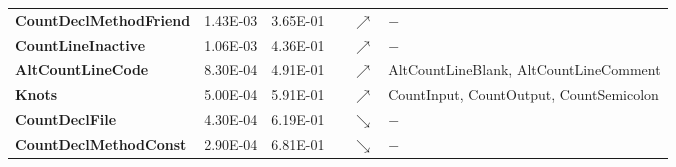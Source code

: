 \begin{sidewaystable}
\begin{tabularx}{\columnwidth}{>{\bfseries}lrrlcl}
CountDeclMethodFriend                      & 1.43E-03 & 3.65E-01 &     & $\nearrow$ &     $-$                                                                                                                                                                                                                                                                                                                                                             \\
CountLineInactive                          & 1.06E-03 & 4.36E-01 &     & $\nearrow$ &    $-$                                                                                                                                                                                                                                                                                                                                                              \\
AltCountLineCode                           & 8.30E-04 & 4.91E-01 &     & $\nearrow$ & AltCountLineBlank, AltCountLineComment                                                                                                                                                                                                                                                                                                                          \\
Knots                                      & 5.00E-04 & 5.91E-01 &     & $\nearrow$ & CountInput, CountOutput, CountSemicolon                                                                                                                                                                                                                                                                                                                         \\
CountDeclFile                              & 4.30E-04 & 6.19E-01 &     & $\searrow$ &    $-$                                                                                                                                                                                                                                                                                                                                                              \\
CountDeclMethodConst                       &2.90E-04 & 6.81E-01 &     & $\searrow$ &    $-$                                                                                                                                                                                                                                                                                                                                                              \\

\end{tabularx}
\end{sidewaystable}
